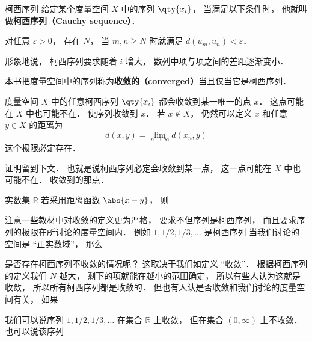 

\begin{definition}{柯西序列}
给定某个度量空间 $X$ 中的序列 $\qty{x_i}$， 当满足以下条件时， 他就叫做\textbf{柯西序列（Cauchy sequence）}．

对任意 $\varepsilon > 0$， 存在 $N$， 当 $m, n \geqslant N$ 时就满足 $d(u_m, u_n) < \varepsilon$．
\end{definition}

形象地说， 柯西序列要求随着 $i$ 增大， 数列中项与项之间的差距逐渐变小．

\begin{definition}{}\label{cauchy_def1}
本书把度量空间中的序列称为\textbf{收敛的（converged）}当且仅当它是柯西序列．
\end{definition}

\begin{theorem}{}
度量空间 $X$ 中的任意柯西序列 $\qty{x_i}$ 都会收敛到某一唯一的点 $x$． 这点可能在 $X$ 中也可能不在． 使序列收敛到 $x$． 若 $x \notin X$， 仍然可以定义 $x$ 和任意 $y\in X$ 的距离为
\begin{equation}
d(x, y) = \lim_{n\to\infty} d(x_n, y)
\end{equation}
这个极限必定存在．
\end{theorem}
证明留到下文． 也就是说柯西序列必定会收敛到某一点， 这一点可能在 $X$ 中也可能不在． 收敛到的那点．


\begin{theorem}{}
实数集 $\mathbb R$ 若采用距离函数 $\abs{x -y}$， 则
\end{theorem}


注意一些教材中对收敛的定义更为严格， 要求不但序列是柯西序列， 而且要求序列的极限在所讨论的度量空间内． 例如 $1, 1/2, 1/3, \dots$ 是柯西序列    当我们讨论的空间是 “正实数域”， 那么



是否存在柯西序列不收敛的情况呢？ 这取决于我们如定义 “收敛”． 根据柯西序列的定义我们 $N$ 越大， 剩下的项就能在越小的范围确定， 所以有些人认为这就是收敛， 所以所有柯西序列都是收敛的． 但也有人认是否收敛和我们讨论的度量空间有关， 如果
\begin{example}{}
我们可以说序列 $1, 1/2, 1/3, \dots$ 在集合 $\mathbb R$ 上收敛， 但在集合 $(0, \infty)$ 上不收敛． 也可以说该序列
\end{example}

